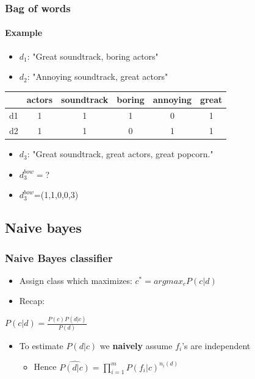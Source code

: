 \documentclass{beamer}
\begin{document}
\begin{frame}
	\frametitle{Bag of words}
	\framesubtitle{Example}
	\begin{itemize}
		\item $d_1$: "Great soundtrack, boring actors"
		\item $d_2$: "Annoying soundtrack, great actors"
	\end{itemize}
	\begin{center}
	\begin{table}
		\begin{tabular}{c|c|c|c|c|c}
			& actors & soundtrack & boring & annoying & great \\ \hline \hline
			d1 & 1 & 1 & 1 & 0 & 1 \\
			d2 & 1 & 1 & 0 & 1 & 1
		\end{tabular}
	\end{table}
	\end{center}
	
	\begin{itemize}
		\item $d_3$: "Great soundtrack, great actors, great popcorn."
		\item $d_3^{bow}=$? \pause
		\item $d_3^{bow}$=(1,1,0,0,3)
	\end{itemize}
\end{frame}

\subsection{Naive bayes}
\begin{frame}
	\frametitle{Naive Bayes classifier}
	\begin{itemize}
		\item Assign class which maximizes: $c^{*}=argmax_{c} P(c|d)$
		\pause
		\item Recap:
	\end{itemize}
	
	\begin{Definition}
		\center
		$P(c|d) = \frac{P(c)P(d|c)}{P(d)}$
	\end{Definition}
	\pause
	\begin{itemize}
		\item To estimate $P(d|c)$ we \textbf{naively} assume $f_i$'s are independent
		\pause
		\begin{itemize}
			\item Hence $\widehat{P(d|c)}=\prod_{i=1}^{m}P(f_i|c)^{n_i(d)}$ 
		\end{itemize}
	\end{itemize}
\end{frame}
\end{document}

